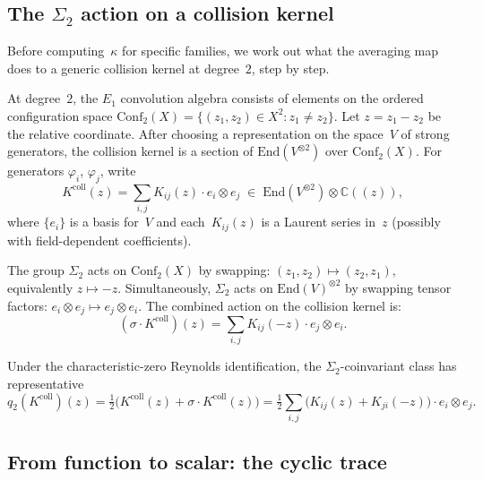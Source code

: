 \documentclass[11pt,reqno]{amsart}
\theoremstyle{definition}
\theoremstyle{remark}
\newcommand{\Eone}{E_1}
\newcommand{\Conf}{\mathrm{Conf}}
\newcommand{\End}{\mathrm{End}}
\numberwithin{equation}{section}
\begin{document}
\subsection{The $\Sigma_2$ action on a collision kernel}
\label{subsec:sigma2}

Before computing~$\kappa$ for specific families, we work
out what the averaging map does to a generic collision kernel at
degree~$2$, step by step.

At degree~$2$, the $\Eone$ convolution algebra consists of
elements on the ordered configuration space
$\Conf_2(X) = \{(z_1,z_2) \in X^2 : z_1 \neq z_2\}$.
Let $z = z_1 - z_2$ be the relative coordinate.
After choosing a representation on the space~$V$ of strong generators,
the collision kernel is a section of $\End(V^{\otimes 2})$ over
$\Conf_2(X)$.
For generators $\varphi_i$, $\varphi_j$, write
\begin{equation}\label{eq:generic-r}
K^{\mathrm{coll}}(z) = \sum_{i,j} K_{ij}(z)\cdot
e_i \otimes e_j
\;\in\;
\End(V^{\otimes 2})\otimes\mathbb{C}((z)),
\end{equation}
where $\{e_i\}$ is a basis for~$V$ and each~$K_{ij}(z)$ is a
Laurent series in~$z$ (possibly with field-dependent
coefficients).

The group $\Sigma_2$ acts on $\Conf_2(X)$ by swapping:
$(z_1,z_2) \mapsto (z_2,z_1)$, equivalently $z \mapsto -z$.
Simultaneously, $\Sigma_2$ acts on $\End(V)^{\otimes 2}$ by
swapping tensor factors: $e_i \otimes e_j \mapsto
e_j \otimes e_i$. The combined action on the collision kernel is:
\begin{equation}\label{eq:sigma2-action}
(\sigma \cdot K^{\mathrm{coll}})(z) = \sum_{i,j} K_{ij}(-z)\cdot
e_j \otimes e_i.
\end{equation}

Under the characteristic-zero Reynolds identification, the
$\Sigma_2$-coinvariant class has representative
\begin{equation}\label{eq:sigma2-coinvariant}
q_2(K^{\mathrm{coll}})(z)
= \tfrac{1}{2}\bigl(K^{\mathrm{coll}}(z)
+ \sigma\cdot K^{\mathrm{coll}}(z)\bigr)
= \tfrac{1}{2}\sum_{i,j}
\bigl(K_{ij}(z) + K_{ji}(-z)\bigr)\cdot
e_i \otimes e_j.
\end{equation}

\subsection{From function to scalar: the cyclic trace}
\label{subsec:cyclic-trace}
\end{document}

